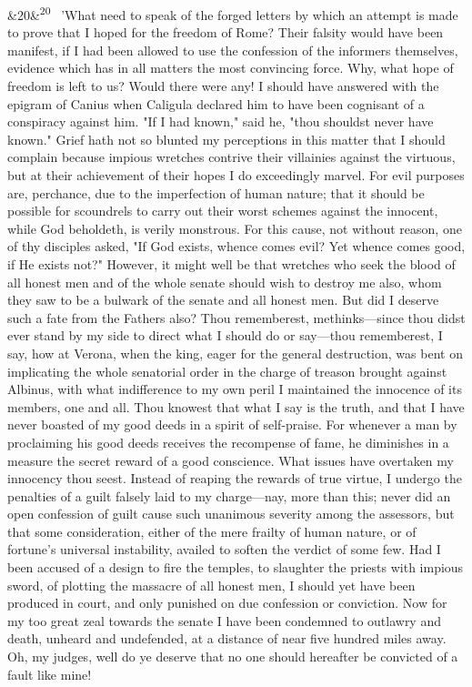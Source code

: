 \documentclass[12pt]{article}
\newcommand{\para}[1][]{\par\noindent\ifx&#1&\else\textsuperscript{\footnotesize #1}~\fi}
\begin{document}
\para[20] 'What need to speak of the forged letters by which an attempt is made to prove that I hoped for the freedom of Rome? Their falsity would have been manifest, if I had been allowed to use the confession of the informers themselves, evidence which has in all matters the most convincing force. Why, what hope of freedom is left to us? Would there were any! I should have answered with the epigram of Canius when Caligula declared him to have been cognisant of a conspiracy against him. "If I had known," said he, "thou shouldst never have known." Grief hath not so blunted my perceptions in this matter that I should complain because impious wretches contrive their villainies against the virtuous, but at their achievement of their hopes I do exceedingly marvel. For evil purposes are, perchance, due to the imperfection of human nature; that it should be possible for scoundrels to carry out their worst schemes against the innocent, while God beholdeth, is verily monstrous. For this cause, not without reason, one of thy disciples asked, "If God exists, whence comes evil? Yet whence comes good, if He exists not?" However, it might well be that wretches who seek the blood of all honest men and of the whole senate should wish to destroy me also, whom they saw to be a bulwark of the senate and all honest men. But did I deserve such a fate from the Fathers also? Thou rememberest, methinks---since thou didst ever stand by my side to direct what I should do or say---thou rememberest, I say, how at Verona, when the king, eager for the general destruction, was bent on implicating the whole senatorial order in the charge of treason brought against Albinus, with what indifference to my own peril I maintained the innocence of its members, one and all. Thou knowest that what I say is the truth, and that I have never boasted of my good deeds in a spirit of self-praise. For whenever a man by proclaiming his good deeds receives the recompense of fame, he diminishes in a measure the secret reward of a good conscience. What issues have overtaken my innocency thou seest. Instead of reaping the rewards of true virtue, I undergo the penalties of a guilt falsely laid to my charge---nay, more than this; never did an open confession of guilt cause such unanimous severity among the assessors, but that some consideration, either of the mere frailty of human nature, or of fortune's universal instability, availed to soften the verdict of some few. Had I been accused of a design to fire the temples, to slaughter the priests with impious sword, of plotting the massacre of all honest men, I should yet have been produced in court, and only punished on due confession or conviction. Now for my too great zeal towards the senate I have been condemned to outlawry and death, unheard and undefended, at a distance of near five hundred miles away. Oh, my judges, well do ye deserve that no one should hereafter be convicted of a fault like mine!
\end{document}
